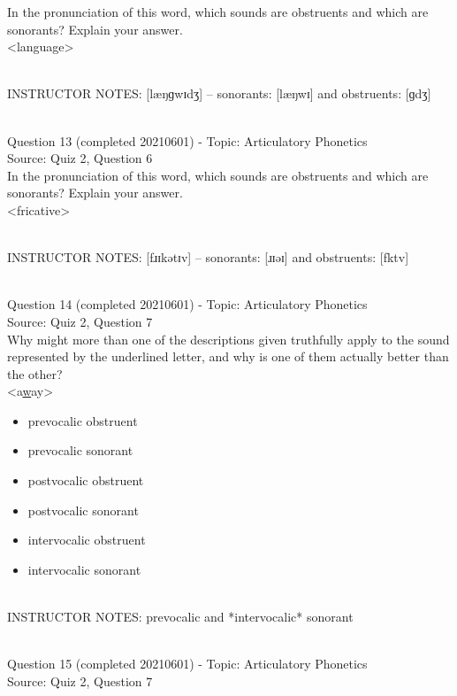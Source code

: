 \documentclass[12pt]{article}
\begin{document}
In the pronunciation of this word, which sounds are obstruents and which are sonorants? Explain your answer.\\

<language>


~\\
INSTRUCTOR NOTES: [læŋɡwɪdʒ] -- sonorants: [læŋwɪ] and obstruents: [ɡdʒ]


~\\

{\large Question 13} (completed 20210601) - Topic: Articulatory Phonetics\\
Source: Quiz 2, Question 6\\

In the pronunciation of this word, which sounds are obstruents and which are sonorants? Explain your answer.\\

<fricative>


~\\
INSTRUCTOR NOTES: [fɹɪkətɪv] -- sonorants: [ɹɪəɪ] and obstruents: [fktv]


~\\

{\large Question 14} (completed 20210601) - Topic: Articulatory Phonetics\\
Source: Quiz 2, Question 7\\

Why might more than one of the descriptions given truthfully apply to the sound represented by the underlined letter, and why is one of them actually better than the other?\\

<a\underline{w}ay>

\begin{itemize} \item prevocalic obstruent \item prevocalic sonorant \item postvocalic obstruent \item postvocalic sonorant \item intervocalic obstruent \item intervocalic sonorant \end{itemize}


~\\
INSTRUCTOR NOTES: prevocalic and *intervocalic* sonorant


~\\

{\large Question 15} (completed 20210601) - Topic: Articulatory Phonetics\\
Source: Quiz 2, Question 7\\
\end{document}
